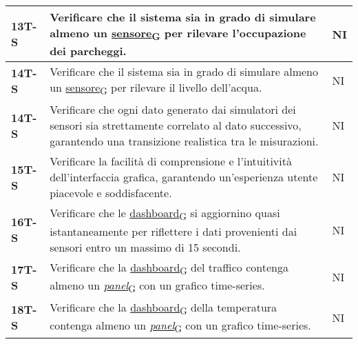 \begin{longtable}{|>{\raggedright\arraybackslash}m{}|>{\raggedright\arraybackslash}m{}|>{\raggedright\arraybackslash}m{}|}
	\hline
	\textbf{13T-S}  & Verificare che il sistema sia in grado di simulare almeno un \href{https://7last.github.io/docs/rtb/documentazione-interna/glossario\#sensore}{sensore\textsubscript{G}} per rilevare l'occupazione dei parcheggi.                                                                                   & NI             \\
	\hline
	\textbf{14T-S}  & Verificare che il sistema sia in grado di simulare almeno un \href{https://7last.github.io/docs/rtb/documentazione-interna/glossario\#sensore}{sensore\textsubscript{G}} per rilevare il livello dell'acqua.                                                                                         & NI             \\
	\hline
	\textbf{14T-S}  & Verificare che ogni dato generato dai simulatori dei sensori sia strettamente correlato al dato successivo, garantendo una transizione realistica tra le misurazioni.                            & NI             \\
	\hline
	\textbf{15T-S}  & Verificare la facilità di comprensione e l'intuitività dell'interfaccia grafica, garantendo un'esperienza utente piacevole e soddisfacente.                                                      & NI             \\
	\hline
	\textbf{16T-S}  & Verificare che le \href{https://7last.github.io/docs/rtb/documentazione-interna/glossario\#dashboard}{dashboard\textsubscript{G}} si aggiornino quasi istantaneamente per riflettere i dati provenienti dai sensori entro un massimo di 15 secondi.                                                    & NI             \\
	\hline
	\textbf{17T-S}  & Verificare che la \href{https://7last.github.io/docs/rtb/documentazione-interna/glossario\#dashboard}{dashboard\textsubscript{G}} del traffico contenga almeno un \href{https://7last.github.io/docs/rtb/documentazione-interna/glossario\#panel}{\textit{panel}\textsubscript{G}} con un grafico time-series.                                                                                           & NI             \\
	\hline
	\textbf{18T-S}  & Verificare che la \href{https://7last.github.io/docs/rtb/documentazione-interna/glossario\#dashboard}{dashboard\textsubscript{G}} della temperatura contenga almeno un \href{https://7last.github.io/docs/rtb/documentazione-interna/glossario\#panel}{\textit{panel}\textsubscript{G}} con un grafico time-series.                                                                                      & NI             \\

\end{longtable}
